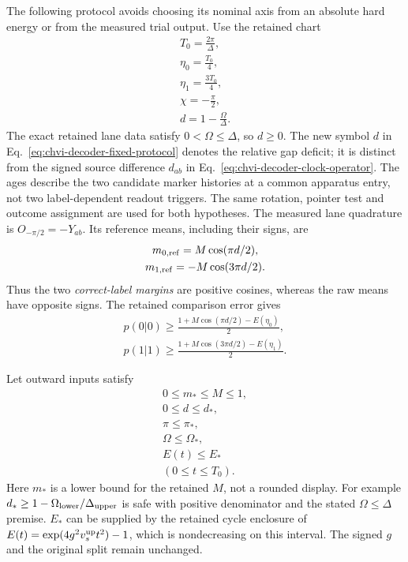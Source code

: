 The following protocol avoids choosing its nominal axis from an absolute
hard energy or from the measured trial output. Use the retained chart
\begin{equation}
\begin{gathered}
T_0=\frac{2\pi}{\Delta},\\
 \eta_0=\frac{T_0}{4},\\
 \eta_1=\frac{3T_0}{4},\\
 \chi=-\frac\pi2,
 \\
 d=1-\frac{\Omega}{\Delta}.
\end{gathered}
\label{eq:chvi-decoder-fixed-protocol}
\end{equation}
The exact retained lane data satisfy $0<\Omega\leq\Delta$, so $d\geq0$.
The new symbol $d$ in Eq.~\eqref{eq:chvi-decoder-fixed-protocol} denotes
the relative gap deficit; it is distinct from the signed source
difference $d_{ab}$ in Eq.~\eqref{eq:chvi-decoder-clock-operator}.
The ages describe the two candidate marker histories at a common apparatus
entry, not two label-dependent readout triggers. The same rotation,
pointer test and outcome assignment are used for both hypotheses.
The measured lane quadrature is $O_{-\pi/2}=-Y_{ab}$.
Its reference means, including their signs, are
\begin{equation}
\begin{gathered}
m_{0,\rm ref}=M\cos(\pi d/2),\\
 m_{1,\rm ref}=-M\cos(3\pi d/2).
\end{gathered}
\label{eq:chvi-decoder-fixed-means}
\end{equation}
Thus the two \emph{correct-label margins} are positive cosines, whereas
the raw means have opposite signs. The retained comparison error gives
\begin{equation}\begin{gathered}
p(0|0)\geq\frac{1+M\cos(\pi d/2)-E(\eta_0)}2,
 \\
 p(1|1)\geq\frac{1+M\cos(3\pi d/2)-E(\eta_1)}2.
\label{eq:chvi-decoder-nominal-probabilities}
\end{gathered}\end{equation}

Let outward inputs satisfy
\begin{equation}\begin{gathered}
0\leq m_*\leq M\leq1,\\
 0\leq d\leq d_*,\\
 \pi\leq\pi_*,\\
 \Omega\leq\Omega_*,\\
 E(t)\leq E_*\\
(0\leq t\leq T_0).
\label{eq:chvi-decoder-outward-inputs}
\end{gathered}\end{equation}
Here $m_*$ is a lower bound for the retained $M$, not a rounded display.
For example $d_*\geq1-\Omega_{\rm lower}/\Delta_{\rm upper}$ is safe
with positive denominator and the stated $\Omega\leq\Delta$ premise.
$E_*$ can be supplied by the retained cycle enclosure of
$E(t)=\exp(4g^2v_s^{\rm up}t^2)-1$, which is nondecreasing on this
interval. The signed $g$ and the original split remain unchanged.

